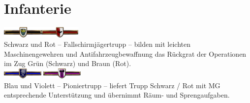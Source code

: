 \section{Infanterie}
\includegraphics[width=20mm]{./img/truppenordnung/infanterie/TrSchwarz}\quad\includegraphics[width=20mm]{./img/truppenordnung/infanterie/TrRot}\\
Schwarz und Rot -- Fallschirmjägertrupp -- bilden mit leichten Maschinengewehren und Antifahrzeugbewaffnung das Rückgrat der Operationen im Zug Grün (Schwarz) und Braun (Rot).\\

\includegraphics[width=20mm]{./img/truppenordnung/infanterie/TrBlau} \quad \includegraphics[width=20mm]{./img/truppenordnung/infanterie/TrViolett}\\
Blau und Violett -- Pioniertrupp -- liefert Trupp Schwarz / Rot mit MG entsprechende Unterstützung und übernimmt Räum- und Sprengaufgaben.